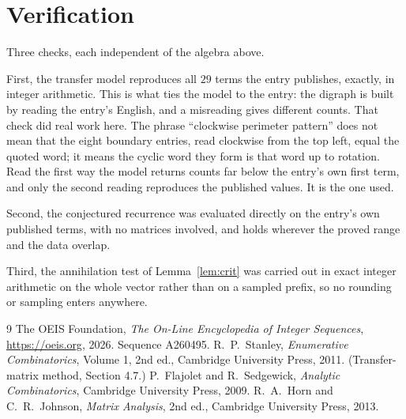 \documentclass[11pt,a4paper]{article}
\theoremstyle{plain}
\theoremstyle{definition}
\begin{document}
\section{Verification}

Three checks, each independent of the algebra above.

First, the transfer model reproduces all $29$ terms the entry publishes, exactly, in
integer arithmetic. This is what ties the model to the entry: the digraph is built by reading
the entry's English, and a misreading gives different counts. That check did real work here. The phrase ``clockwise perimeter pattern'' does not mean that the eight boundary entries, read clockwise from the top left, equal the quoted word; it means the cyclic word they form is that word up to rotation. Read the first way the model returns counts far below the entry's own first term, and only the second reading reproduces the published values. It is the one used.

Second, the conjectured recurrence was evaluated directly on the entry's own published terms,
with no matrices involved, and holds wherever the proved range and the data overlap.

Third, the annihilation test of Lemma~\ref{lem:crit} was carried out in exact integer
arithmetic on the whole vector rather than on a sampled prefix, so no rounding or sampling
enters anywhere.

\begin{thebibliography}{9}
 The OEIS Foundation, \emph{The On-Line Encyclopedia of Integer
Sequences}, \url{https://oeis.org}, 2026. Sequence A260495.
 R.~P.~Stanley, \emph{Enumerative Combinatorics}, Volume 1, 2nd ed.,
Cambridge University Press, 2011. (Transfer-matrix method, Section 4.7.)
 P.~Flajolet and R.~Sedgewick, \emph{Analytic Combinatorics}, Cambridge
University Press, 2009.
 R.~A.~Horn and C.~R.~Johnson, \emph{Matrix Analysis}, 2nd ed., Cambridge
University Press, 2013.
\end{thebibliography}
\end{document}
